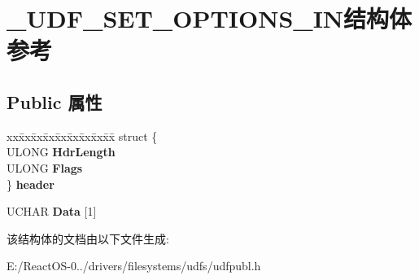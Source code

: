 \hypertarget{struct___u_d_f___s_e_t___o_p_t_i_o_n_s___i_n}{}\section{\+\_\+\+U\+D\+F\+\_\+\+S\+E\+T\+\_\+\+O\+P\+T\+I\+O\+N\+S\+\_\+\+I\+N结构体 参考}
\label{struct___u_d_f___s_e_t___o_p_t_i_o_n_s___i_n}
\subsection*{Public 属性}
\begin{DoxyCompactItemize}
\item 
\mbox{\label{struct___u_d_f___s_e_t___o_p_t_i_o_n_s___i_n_aa97be7e0b150646c7f5fb940066c9514}} 
\begin{tabbing}
xx\=xx\=xx\=xx\=xx\=xx\=xx\=xx\=xx\=\kill
struct \{\\
\>ULONG {\bfseries HdrLength}\\
\>ULONG {\bfseries Flags}\\
\} {\bfseries header}\\

\end{tabbing}\item 
\mbox{\label{struct___u_d_f___s_e_t___o_p_t_i_o_n_s___i_n_a6f54b6ec2b868e19989cba9e94526762}} 
U\+C\+H\+AR {\bfseries Data} \mbox{[}1\mbox{]}
\end{DoxyCompactItemize}


该结构体的文档由以下文件生成\+:\begin{DoxyCompactItemize}
\item 
E\+:/\+React\+O\+S-\/0../drivers/filesystems/udfs/udfpubl.\+h\end{DoxyCompactItemize}
